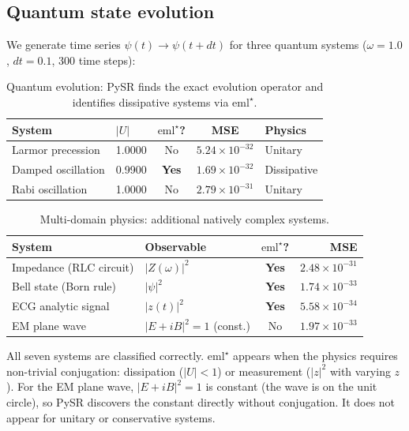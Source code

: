 \documentclass[12pt,a4paper]{article}
\newcommand{\emlstar}{\mathrm{eml}^{\star}}
\begin{document}
\subsection{Quantum state evolution}
\label{sec:evolution}

We generate time series $\psi(t) \to \psi(t+dt)$ for three
quantum systems ($\omega = 1.0$, $dt = 0.1$, 300 time steps):

\begin{table}[h]
\centering
\caption{Quantum evolution: PySR finds the exact evolution operator
and identifies dissipative systems via $\emlstar$.}
\label{tab:evolution}
\begin{tabular}{llccl}
\toprule
System & $|U|$ & $\emlstar$? & MSE & Physics \\
\midrule
Larmor precession & 1.0000 & No & $5.24 \times 10^{-32}$ & Unitary \\
Damped oscillation & 0.9900 & \textbf{Yes} & $1.69 \times 10^{-32}$ & Dissipative \\
Rabi oscillation & 1.0000 & No & $2.79 \times 10^{-31}$ & Unitary \\
\bottomrule
\end{tabular}
\end{table}

\begin{table}[h]
\centering
\caption{Multi-domain physics: additional natively complex systems.}
\label{tab:multidomain}
\begin{tabular}{llcr}
\toprule
System & Observable & $\emlstar$? & MSE \\
\midrule
Impedance (RLC circuit) & $|Z(\omega)|^2$ & \textbf{Yes} & $2.48 \times 10^{-31}$ \\
Bell state (Born rule) & $|\psi|^2$ & \textbf{Yes} & $1.74 \times 10^{-33}$ \\
ECG analytic signal & $|z(t)|^2$ & \textbf{Yes} & $5.58 \times 10^{-34}$ \\
EM plane wave & $|E+iB|^2 = 1$ (const.) & No & $1.97 \times 10^{-33}$ \\
\bottomrule
\end{tabular}
\end{table}

All seven systems are classified correctly.
$\emlstar$ appears when the physics requires non-trivial
conjugation: dissipation ($|U| < 1$) or measurement ($|z|^2$
with varying $z$). For the EM plane wave, $|E+iB|^2 = 1$
is constant (the wave is on the unit circle), so PySR
discovers the constant directly without conjugation.
It does not appear for unitary or conservative systems.
\end{document}
